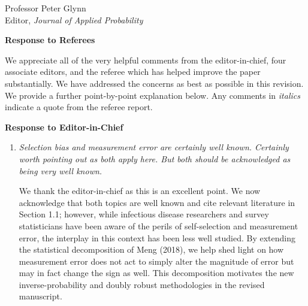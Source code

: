 \documentclass[11pt]{letter} %
\begin{document}

\begin{letter}{Professor
	Peter Glynn\\
	Editor, {\em Journal of Applied Probability}}



\signature{Walter Dempsey\\
University of Michigan\\
Department of Biostatistics\\
1415 Washington Heights\\
Ann Arbor, MI 48103} %


\vspace{5mm}

\newpage

{\bf Response to Referees}

We appreciate all of the very helpful comments from the editor-in-chief, four associate editors, and the referee which has helped improve the paper substantially. We have addressed the concerns as best as possible in this revision. We provide a further point-by-point explanation below. Any comments in {\it italics} indicate a quote from the referee report.

{\bf Response to Editor-in-Chief}
\begin{enumerate}
\item {\it Selection bias and measurement error are certainly well known.
Certainly worth pointing out as both apply here.  But both should be acknowledged as being very well known.}

\vspace{5mm}
We thank the editor-in-chief as this is an excellent point.  We now acknowledge that both topics are well known and cite relevant literature in Section 1.1; however, while infectious disease researchers and survey statisticians have been aware of the perils of self-selection and measurement error, the interplay in this context has been less well studied.   By extending the statistical decomposition of Meng (2018), we help shed light on how measurement error does not act to simply alter the magnitude of error but may in fact change the sign as well.  This decomposition motivates the new inverse-probability and doubly robust methodologies in the revised manuscript.
\vspace{5mm}


\end{enumerate}
\end{letter}
\end{document}
